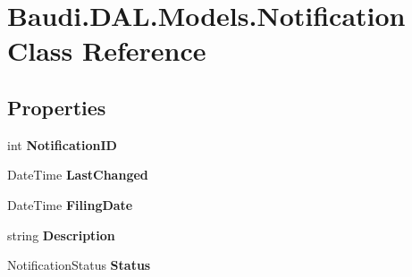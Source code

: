 \hypertarget{class_baudi_1_1_d_a_l_1_1_models_1_1_notification}{}\section{Baudi.\+D\+A\+L.\+Models.\+Notification Class Reference}
\label{class_baudi_1_1_d_a_l_1_1_models_1_1_notification}
\subsection*{Properties}
\begin{DoxyCompactItemize}
\item 
\hypertarget{class_baudi_1_1_d_a_l_1_1_models_1_1_notification_aedf76b5c5285279d074c3f6fbe2a860b}{}int {\bfseries Notification\+I\+D}\label{class_baudi_1_1_d_a_l_1_1_models_1_1_notification_aedf76b5c5285279d074c3f6fbe2a860b}

\item 
\hypertarget{class_baudi_1_1_d_a_l_1_1_models_1_1_notification_af04e232502402ce94fce3faed2c7c45e}{}Date\+Time {\bfseries Last\+Changed}\label{class_baudi_1_1_d_a_l_1_1_models_1_1_notification_af04e232502402ce94fce3faed2c7c45e}

\item 
\hypertarget{class_baudi_1_1_d_a_l_1_1_models_1_1_notification_a15acd0dd96a6d99c290cfd855273ba1a}{}Date\+Time {\bfseries Filing\+Date}\label{class_baudi_1_1_d_a_l_1_1_models_1_1_notification_a15acd0dd96a6d99c290cfd855273ba1a}

\item 
\hypertarget{class_baudi_1_1_d_a_l_1_1_models_1_1_notification_ab40d85b5a3ba99c3e61a1e70337cf8cc}{}string {\bfseries Description}\label{class_baudi_1_1_d_a_l_1_1_models_1_1_notification_ab40d85b5a3ba99c3e61a1e70337cf8cc}

\item 
\hypertarget{class_baudi_1_1_d_a_l_1_1_models_1_1_notification_a45f2a9069f7c7b9a2aa71b8d9dae29c3}{}Notification\+Status {\bfseries Status}\label{class_baudi_1_1_d_a_l_1_1_models_1_1_notification_a45f2a9069f7c7b9a2aa71b8d9dae29c3}


\end{DoxyCompactItemize}
